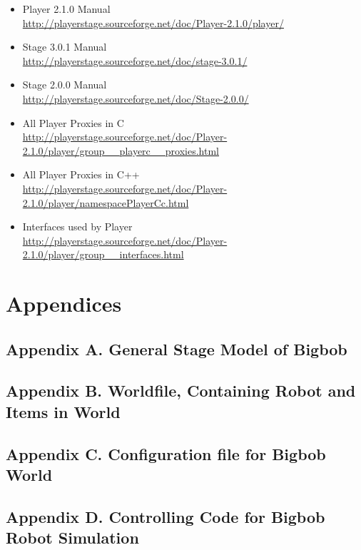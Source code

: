 \documentclass[a4paper]{article}
\begin{document}
\begin{itemize}

\item Player 2.1.0 Manual \\
\url{http://playerstage.sourceforge.net/doc/Player-2.1.0/player/}

\item Stage 3.0.1 Manual \\
\url{http://playerstage.sourceforge.net/doc/stage-3.0.1/}

\item Stage 2.0.0 Manual\\
\url{http://playerstage.sourceforge.net/doc/Stage-2.0.0/}

\item All Player Proxies in C\\
\url{http://playerstage.sourceforge.net/doc/Player-2.1.0/player/group__playerc__proxies.html}

\item All Player Proxies in C++\\
\url{http://playerstage.sourceforge.net/doc/Player-2.1.0/player/namespacePlayerCc.html}

\item Interfaces used by Player\\
\url{http://playerstage.sourceforge.net/doc/Player-2.1.0/player/group__interfaces.html}
\end{itemize}









\section{Appendices}

\subsection*{Appendix A. General Stage Model of Bigbob}\label{app:Abigbob.inc}


\subsection*{Appendix B. Worldfile, Containing Robot and Items in World}\label{app:Brobotsjunkworld}


\subsection*{Appendix C. Configuration file for Bigbob World}\label{app:Cconfig}


\subsection*{Appendix D. Controlling Code for Bigbob Robot Simulation}\label{app:Dbigbobcode}

\end{document}
